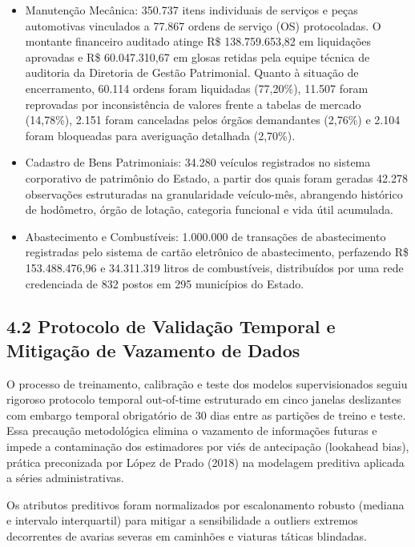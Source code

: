 \documentclass[10pt,a4paper,journal]{article}
\begin{document}
\begin{itemize}
\item Manutenção Mecânica: 350.737 itens individuais de serviços e peças automotivas vinculados a 77.867 ordens de serviço (OS) protocoladas. O montante financeiro auditado atinge R\$ 138.759.653,82 em liquidações aprovadas e R\$ 60.047.310,67 em glosas retidas pela equipe técnica de auditoria da Diretoria de Gestão Patrimonial. Quanto à situação de encerramento, 60.114 ordens foram liquidadas (77,20\%), 11.507 foram reprovadas por inconsistência de valores frente a tabelas de mercado (14,78\%), 2.151 foram canceladas pelos órgãos demandantes (2,76\%) e 2.104 foram bloqueadas para averiguação detalhada (2,70\%).
\end{itemize}
\begin{itemize}
\item Cadastro de Bens Patrimoniais: 34.280 veículos registrados no sistema corporativo de patrimônio do Estado, a partir dos quais foram geradas 42.278 observações estruturadas na granularidade veículo-mês, abrangendo histórico de hodômetro, órgão de lotação, categoria funcional e vida útil acumulada.
\end{itemize}
\begin{itemize}
\item Abastecimento e Combustíveis: 1.000.000 de transações de abastecimento registradas pelo sistema de cartão eletrônico de abastecimento, perfazendo R\$ 153.488.476,96 e 34.311.319 litros de combustíveis, distribuídos por uma rede credenciada de 832 postos em 295 municípios do Estado.
\end{itemize}
\subsection{4.2 Protocolo de Validação Temporal e Mitigação de Vazamento de Dados}
O processo de treinamento, calibração e teste dos modelos supervisionados seguiu rigoroso protocolo temporal out-of-time estruturado em cinco janelas deslizantes com embargo temporal obrigatório de 30 dias entre as partições de treino e teste. Essa precaução metodológica elimina o vazamento de informações futuras e impede a contaminação dos estimadores por viés de antecipação (lookahead bias), prática preconizada por López de Prado (2018) na modelagem preditiva aplicada a séries administrativas.

Os atributos preditivos foram normalizados por escalonamento robusto (mediana e intervalo interquartil) para mitigar a sensibilidade a outliers extremos decorrentes de avarias severas em caminhões e viaturas táticas blindadas.
\end{document}
